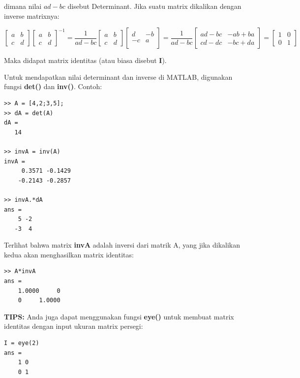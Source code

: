 \documentclass[12pt]{book}
\begin{document}
	dimana nilai $ad-bc$ disebut Determinant.
	Jika suatu matrix dikalikan dengan inverse matrixnya:
	
	\[
	\begin{bmatrix}
		a & b\\
		c & d
	\end{bmatrix}
	\begin{bmatrix}
		a & b\\
		c & d
	\end{bmatrix}^{-1}
	=
	\frac{1}{ad-bc}
	\begin{bmatrix}
		a & b\\
		c & d
	\end{bmatrix}
	\begin{bmatrix}
		d & -b \\
		-c & a\\
	\end{bmatrix}
	=
	\frac{1}{ad-bc}
	\begin{bmatrix}
		ad-bc & -ab+ba\\
		cd-dc & -bc+da
	\end{bmatrix}
	=
	\begin{bmatrix}
		1 & 0\\
		0 & 1
	\end{bmatrix}
	\]
	
	Maka didapat matrix identitas (atau biasa disebut \textbf{I}).
	
	Untuk mendapatkan nilai determinant dan inverse di MATLAB, digunakan fungsi \textbf{det()} dan \textbf{inv()}.
	Contoh:
	\begin{verbatim}
>> A = [4,2;3,5];
>> dA = det(A)
dA = 
   14
   
>> invA = inv(A)
invA =
     0.3571 -0.1429
    -0.2143 -0.2857
    
>> invA.*dA
ans =
    5 -2
   -3  4
	\end{verbatim}

	Terlihat bahwa matrix \textbf{invA} adalah inversi dari matrik A, yang jika dikalikan kedua akan menghasilkan matrix identitas:
	\begin{verbatim}
>> A*invA
ans =
    1.0000     0
    0     1.0000
	\end{verbatim}

	\textbf{TIPS:} Anda juga dapat menggunakan fungsi \textbf{eye()} untuk membuat matrix identitas dengan input ukuran matrix persegi:
	 \begin{verbatim}
I = eye(2)
ans = 
    1 0
    0 1
	 \end{verbatim}
	
\end{document}
